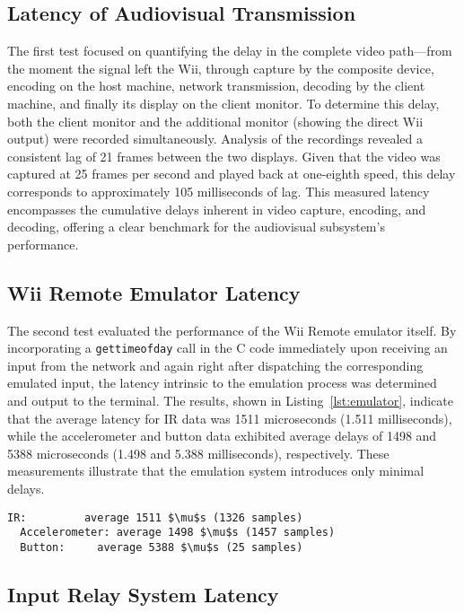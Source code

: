 \subsection{Latency of Audiovisual Transmission}

The first test focused on quantifying the delay in the complete video path—from
the moment the signal left the Wii, through capture by the composite device,
encoding on the host machine, network transmission, decoding by the client
machine, and finally its display on the client monitor. To determine this delay,
both the client monitor and the additional monitor (showing the direct Wii
output) were recorded simultaneously. Analysis of the recordings revealed a
consistent lag of 21 frames between the two displays. Given that the video was
captured at 25 frames per second and played back at one-eighth speed, this delay
corresponds to approximately 105 milliseconds of lag. This measured latency
encompasses the cumulative delays inherent in video capture, encoding, and
decoding, offering a clear benchmark for the audiovisual subsystem’s
performance.

\subsection{Wii Remote Emulator Latency}

The second test evaluated the performance of the Wii Remote emulator itself. By
incorporating a \texttt{gettimeofday} call in the C code immediately upon receiving an
input from the network and again right after dispatching the corresponding
emulated input, the latency intrinsic to the emulation process was determined and output to the terminal.
The results, shown in Listing~\ref{lst:emulator}, indicate that the average
latency for IR data was 1511 microseconds (1.511 milliseconds), while the
accelerometer and button data exhibited average delays of 1498 and 5388
microseconds (1.498 and 5.388 milliseconds), respectively. These measurements
illustrate that the emulation system introduces only minimal delays.


\begin{lstlisting}[caption={Wii Remote Emulator Latency Results}, label=lst:emulator, mathescape=true,]
  IR:         average 1511 $\mu$s (1326 samples)
  Accelerometer: average 1498 $\mu$s (1457 samples)
  Button:     average 5388 $\mu$s (25 samples)
\end{lstlisting}

\subsection{Input Relay System Latency}


